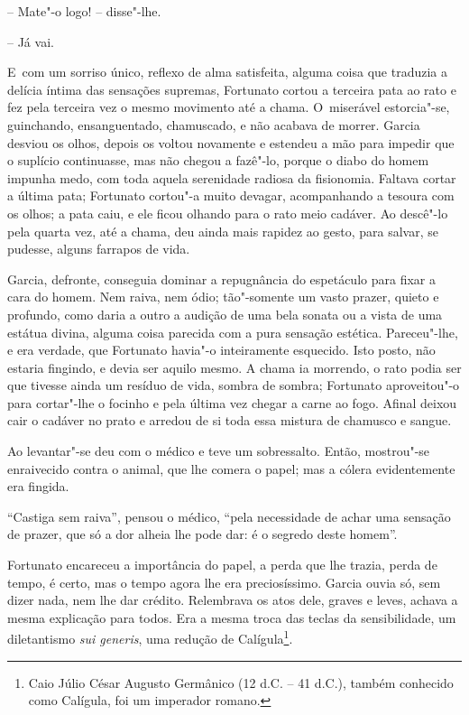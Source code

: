 -- Mate"-o logo! -- disse"-lhe.

-- Já vai.

E~com um sorriso único, reflexo de alma satisfeita, alguma coisa que
traduzia a delícia íntima das sensações supremas, Fortunato cortou a
terceira pata ao rato e fez pela terceira vez o mesmo movimento até a
chama. O~miserável estorcia"-se, guinchando, ensanguentado, chamuscado, e
não acabava de morrer. Garcia desviou os olhos, depois os voltou
novamente e estendeu a mão para impedir que o suplício continuasse, mas
não chegou a fazê"-lo, porque o diabo do homem impunha medo, com toda
aquela serenidade radiosa da fisionomia. Faltava cortar a última pata;
Fortunato cortou"-a muito devagar, acompanhando a tesoura com os olhos; a
pata caiu, e ele ficou olhando para o rato meio cadáver. Ao descê"-lo
pela quarta vez, até a chama, deu ainda mais rapidez ao gesto, para
salvar, se pudesse, alguns farrapos de vida.

Garcia, defronte, conseguia dominar a repugnância do espetáculo para
fixar a cara do homem. Nem raiva, nem ódio; tão"-somente um vasto prazer,
quieto e profundo, como daria a outro a audição de uma bela sonata ou a
vista de uma estátua divina, alguma coisa parecida com a pura sensação
estética. Pareceu"-lhe, e era verdade, que Fortunato havia"-o inteiramente
esquecido. Isto posto, não estaria fingindo, e devia ser aquilo mesmo. A
chama ia morrendo, o rato podia ser que tivesse ainda um resíduo de
vida, sombra de sombra; Fortunato aproveitou"-o para cortar"-lhe o focinho
e pela última vez chegar a carne ao fogo. Afinal deixou cair o cadáver
no prato e arredou de si toda essa mistura de chamusco e sangue.

Ao levantar"-se deu com o médico e teve um sobressalto. Então, mostrou"-se
enraivecido contra o animal, que lhe comera o papel; mas a cólera
evidentemente era fingida.

``Castiga sem raiva'', pensou o médico, ``pela necessidade de achar uma
sensação de prazer, que só a dor alheia lhe pode dar: é o segredo deste
homem''.

Fortunato encareceu a importância do papel, a perda que lhe trazia,
perda de tempo, é certo, mas o tempo agora lhe era preciosíssimo. Garcia
ouvia só, sem dizer nada, nem lhe dar crédito. Relembrava os atos dele,
graves e leves, achava a mesma explicação para todos. Era a mesma troca
das teclas da sensibilidade, um diletantismo \emph{sui generis}, uma
redução de Calígula\footnote{Caio Júlio César Augusto Germânico (12 d.C.
  -- 41 d.C.), também conhecido como Calígula, foi um imperador romano.}.

